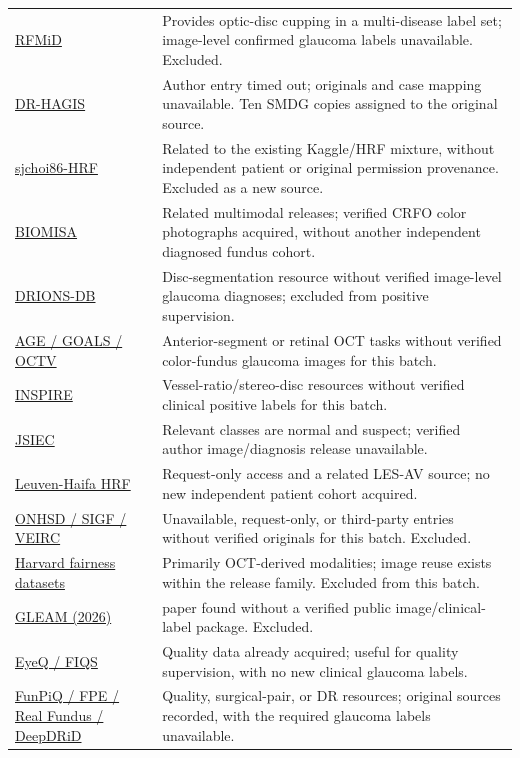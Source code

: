 \documentclass[
  10pt,
]{article}
\begin{document}
\begin{longtable}[]{@{}
  >{\raggedright\arraybackslash}p{}
  >{\raggedright\arraybackslash}p{}@{}}
\href{https://doi.org/10.3390/data6020014}{RFMiD} & Provides optic-disc
cupping in a multi-disease label set; image-level confirmed glaucoma
labels unavailable. Excluded. \\
\href{https://personalpages.manchester.ac.uk/staff/niall.p.mcloughlin/}{DR-HAGIS}
& Author entry timed out; originals and case mapping unavailable. Ten
SMDG copies assigned to the original source. \\
\href{https://github.com/yiweichen04/retina_dataset}{sjchoi86-HRF} &
Related to the existing Kaggle/HRF mixture, without independent patient
or original permission provenance. Excluded as a new source. \\
\href{https://data.mendeley.com/datasets/2rnnz5nz74/2}{BIOMISA} &
Related multimodal releases; verified CRFO color photographs acquired,
without another independent diagnosed fundus cohort. \\
\href{https://www.researchgate.net/publication/326460478_Glaucoma_dataset_-_DRIONS-DB}{DRIONS-DB}
& Disc-segmentation resource without verified image-level glaucoma
diagnoses; excluded from positive supervision. \\
\href{https://age.grand-challenge.org/Download/}{AGE / GOALS / OCTV} &
Anterior-segment or retinal OCT tasks without verified color-fundus
glaucoma images for this batch. \\
\href{https://medicine.uiowa.edu/eye/inspire-datasets}{INSPIRE} &
Vessel-ratio/stereo-disc resources without verified clinical positive
labels for this batch. \\
\href{https://www.kaggle.com/datasets/linchundan/fundusimage1000}{JSIEC}
& Relevant classes are normal and suspect; verified author
image/diagnosis release unavailable. \\
\href{https://doi.org/10.48804/Z7SHGO}{Leuven-Haifa HRF} & Request-only
access and a related LES-AV source; no new independent patient cohort
acquired. \\
\href{https://github.com/XiaofeiWang2018/DeepGF}{ONHSD / SIGF / VEIRC} &
Unavailable, request-only, or third-party entries without verified
originals for this batch. Excluded. \\
\href{https://github.com/Harvard-Ophthalmology-AI-Lab/Harvard-GDP}{Harvard
fairness datasets} & Primarily OCT-derived modalities; image reuse
exists within the release family. Excluded from this batch. \\
\href{https://doi.org/10.1109/TMI.2026.3692814}{GLEAM (2026)} & 2026
paper found without a verified public image/clinical-label package.
Excluded. \\
\href{https://github.com/HzFu/EyeQ}{EyeQ / FIQS} & Quality data already
acquired; useful for quality supervision, with no new clinical glaucoma
labels. \\
\href{https://zenodo.org/records/21838047}{FunPiQ / FPE / Real Fundus /
DeepDRiD} & Quality, surgical-pair, or DR resources; original sources
recorded, with the required glaucoma labels unavailable. \\
\end{longtable}
\end{document}
